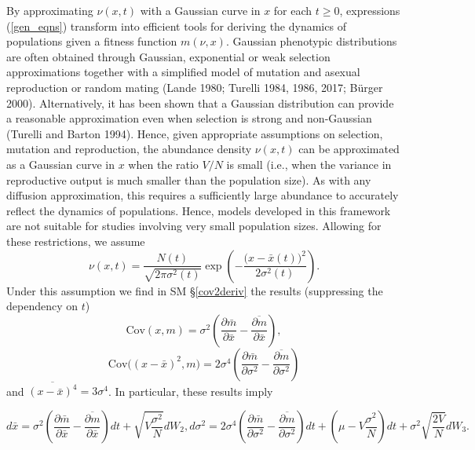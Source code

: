 \documentclass[]{article}
\begin{document}
By approximating \(\nu(x,t)\) with a Gaussian curve in \(x\) for each
\(t\geq0\), expressions (\ref{gen_eqns}) transform into efficient tools
for deriving the dynamics of populations given a fitness function
\(m(\nu,x)\). Gaussian phenotypic distributions are often obtained
through Gaussian, exponential or weak selection approximations together
with a simplified model of mutation and asexual reproduction or random
mating (Lande 1980; Turelli 1984, 1986, 2017; Bürger 2000).
Alternatively, it has been shown that a Gaussian distribution can
provide a reasonable approximation even when selection is strong and
non-Gaussian (Turelli and Barton 1994). Hence, given appropriate
assumptions on selection, mutation and reproduction, the abundance
density \(\nu(x,t)\) can be approximated as a Gaussian curve in \(x\)
when the ratio \(V/N\) is small (i.e., when the variance in reproductive
output is much smaller than the population size). As with any diffusion
approximation, this requires a sufficiently large abundance to
accurately reflect the dynamics of populations. Hence, models developed
in this framework are not suitable for studies involving very small
population sizes. Allowing for these restrictions, we assume
\begin{equation}
\nu(x,t)=\frac{N(t)}{\sqrt{2\pi\sigma^2(t)}}\exp\left(-\frac{\big(x-\bar x(t)\big)^2}{2\sigma^2(t)}\right).
\end{equation} Under this assumption we find in SM \S\ref{cov2deriv} the
results (suppressing the dependency on \(t\))
\begin{equation}\label{covxm}
\mathrm{Cov}(x,m)=\sigma^2\left(\frac{\partial\bar m}{\partial\bar x}-\overline{\frac{\partial m}{\partial\bar x}}\right),
\end{equation} \begin{equation}
\mathrm{Cov}\Big((x-\bar x)^2,m\Big)=2\sigma^4\left(\frac{\partial\bar m}{\partial\sigma^2}-\overline{\frac{\partial m}{\partial\sigma^2}}\right)
\end{equation} and \(\overline{(x-\bar x)^4}=3\sigma^4\). In particular,
these results imply

\begin{subequations}\label{no_inher}
\begin{equation}\label{xbar}
d\bar x=\sigma^2\left(\frac{\partial\bar m}{\partial\bar x}-\overline{\frac{\partial m}{\partial\bar x}}\right)dt+\sqrt{V\frac{\sigma^2}{N}}dW_2,
\end{equation}
\begin{equation}\label{G}
d\sigma^2=2\sigma^4\left(\frac{\partial\bar m}{\partial\sigma^2}-\overline{\frac{\partial m}{\partial\sigma^2}}\right)dt +\left(\mu-V\frac{\sigma^2}{N}\right)dt+\sigma^2\sqrt{\frac{2V}{N}}dW_3.
\end{equation}
\end{subequations}
\end{document}
